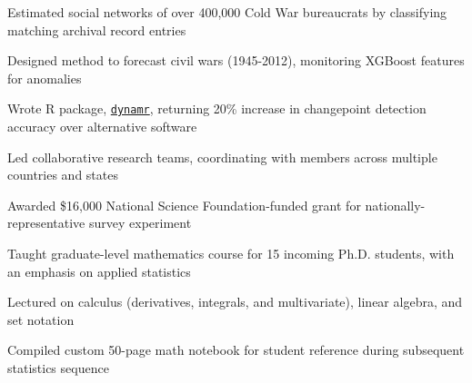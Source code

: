 \documentclass[]{deedy-resume-openfont}
\begin{document}
\begin{flushleft}
 \hspace{3.375in} 
\vspace{-1em}
\begin{tightemize}
    \item Estimated social networks of over 400,000 Cold War bureaucrats by classifying matching archival record entries %
    \item Designed method to forecast civil wars (1945-2012), monitoring XGBoost features for anomalies
    \item Wrote R package, \texttt{\href{http://github.com/dnkent/dynamr}{dynamr}}, returning 20\% increase in changepoint detection accuracy over alternative software
    \item Led collaborative research teams, coordinating with members across multiple countries and states %
    \item Awarded \$16,000 National Science Foundation-funded grant for nationally-representative survey experiment %
\end{tightemize}
\sectionsep


 \hspace{4.275in} 
\vspace{-1em}
\begin{tightemize}
    \item Taught graduate-level mathematics course for 15 incoming Ph.D. students, with an emphasis on applied statistics
    \item Lectured on calculus (derivatives, integrals, and multivariate), linear algebra, and set notation
    \item Compiled custom 50-page math notebook for student reference during subsequent statistics sequence %
\end{tightemize}
\sectionsep



\end{flushleft}
\end{document}
